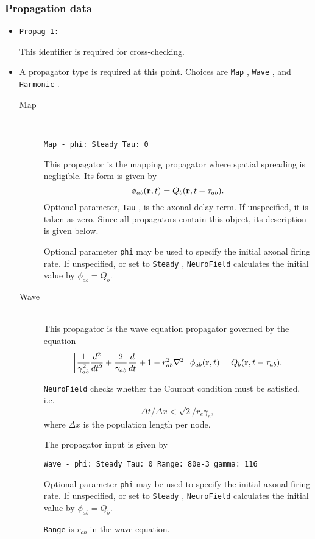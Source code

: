 \documentclass[12pt,a4paper]{article}
\newcommand{\type}[1]{{\small\small\tt #1} }
\newcommand{\NF}[0]{\type{NeuroField}}
\begin{document}
\subsubsection{Propagation data}
\label{sec:prop}
\begin{itemize}
\item
	\begin{lstlisting}
Propag 1:
	\end{lstlisting}
	This identifier is required for cross-checking.
\item A propagator type is required at this point. Choices are \type{Map}, \type{Wave}, and \type{Harmonic}.
\begin{description}
	\item[Map]\ \\
	\begin{lstlisting}
Map - phi: Steady Tau: 0
	\end{lstlisting}
	This propagator is the mapping propagator where spatial spreading is negligible. Its form is given by
	\[\phi_{ab}({\bf r}, t) = Q_b ({\bf r}, t - \tau_{ab}).\]
	Optional parameter, \type{Tau}, is the axonal delay term. If unspecified, it is taken as zero. Since all propagators contain this object, its description is given below.

	Optional parameter \type{phi} may be used to specify the initial axonal firing rate. If unspecified, or set to \type{Steady}, \NF calculates the initial value by \(\phi_{ab}=Q_{b}\).

	\item[Wave]\ \\
	This propagator is the wave equation propagator governed by the equation
	\[\left[\frac{1}{\gamma_{ab}^2}\frac{d^2}{d t^2}+\frac{2}{\gamma_{ab}}\frac{d} {d t}+1 -r^2_{ab}\nabla^2 \right] \phi_{ab}({\bf r},t) =Q_b({\bf r},t-\tau_{ab}).\]

	\NF checks whether the Courant condition must be satisfied, i.e. \[\Delta t/\Delta x<\sqrt{2}/r_e\gamma_e,\] where $\Delta x$ is the population length per node.

	The propagator input is given by
	\begin{lstlisting}
Wave - phi: Steady Tau: 0 Range: 80e-3 gamma: 116
	\end{lstlisting}

	Optional parameter \type{phi} may be used to specify the initial axonal firing rate. If unspecified, or set to \type{Steady}, \NF calculates the initial value by \(\phi_{ab}=Q_{b}\).

	\type{Range} is $r_{ab}$ in the wave equation.
	

\end{description}
\end{itemize}
\end{document}
